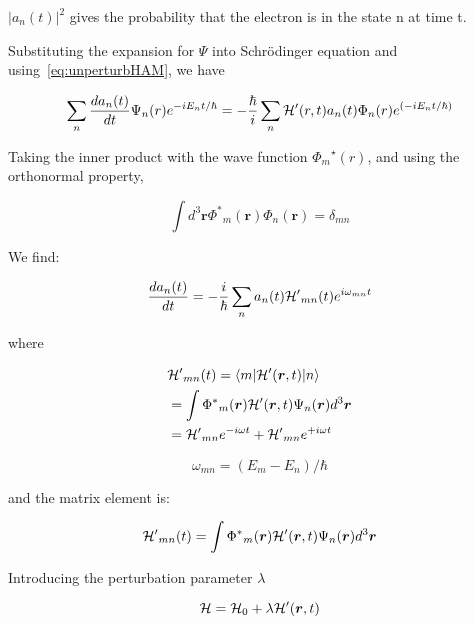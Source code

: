 $|a_n(t)|^2$ gives the probability that the electron is in the state n at time
t.

Substituting the expansion for $\Psi$ into Schr{\"o}dinger equation and
using~\ref{eq:unperturbHAM}, we have

\begin{equation}
  \sum_n \frac{da_n(t)}{dt}\Psi_n(r)e^{-iE_{n}t/\hbar} = -\frac{\hbar}{i}\sum_n \mathcal{H}^{\prime}(r,t)a_n(t)\Phi_n(r)e^{(-iE_{n}t/\hbar)}
\end{equation}

Taking the inner product with the wave function ${\Phi_m}^\star(r)$, and using
the orthonormal property,

\begin{equation}
  \int{d^3}\bm{r}{{\Phi^\ast}_m}(\bm{r})\Phi_n(\bm{r}) = \delta_{mn}
\end{equation}

We find:

\begin{equation}
\frac{d{a_n(t)}}{dt}=-\frac{i}{\hbar}\sum_{n}a_n(t){\mathcal{H}^\prime}_{mn}(t)e^{i\omega_{mn}t}
\end{equation}

where

\begin{eqnarray}
\begin{aligned}
  & {\HAM^\prime}_{mn}(t)=\langle{m}|\HAM^\prime(\bm{r},t)|{n}\rangle \\
  & = \int{\Phi^\ast}_m(\bm{r}){\HAM^\prime}(\bm{r},t)\Psi_n(\bm{r})d^3\bm{r} \\
  & = {\HAM^\prime}_{mn}e^{-i\omega{t}} + {\HAM^\prime}_{mn}e^{+i\omega{t}}
\end{aligned}
\label{eq:HAMintigral}
\end{eqnarray}

\begin{equation}
  {\omega_{mn}}=(E_m-E_n)/\hbar
\end{equation}

and the matrix element is:

\begin{equation}
  {\mathcal{H}^\prime}_{mn}(t)=\int{{\Phi^\ast}_m}(\bm{r})\mathcal{H}^\prime(\bm{r},t)\Psi_{n}(\bm{r})d^3\bm{r}
\end{equation}

Introducing the perturbation parameter $\lambda$


\begin{equation}
  \mathcal{H}=\mathcal{H}_0+\lambda\mathcal{H}^\prime(\bm{r},t)
\end{equation}

